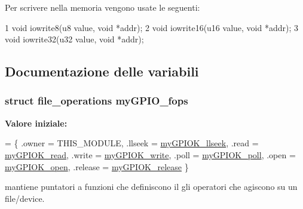 Per scrivere nella memoria vengono usate le seguenti\+:


\begin{DoxyCode}
1 void iowrite8(u8 value, void *addr);
2 void iowrite16(u16 value, void *addr);
3 void iowrite32(u32 value, void *addr);
\end{DoxyCode}


\subsection{Documentazione delle variabili}
\hypertarget{group___kernel-_module_ga9f31111fdb3b4a5944e18d45045e0f01}{
\subsubsection[{my\+G\+P\+I\+O\+\_\+fops}]{\setlength{\rightskip}{0pt plus 5cm}struct file\+\_\+operations my\+G\+P\+I\+O\+\_\+fops\hspace{0.3cm}{\ttfamily [static]}}}\label{group___kernel-_module_ga9f31111fdb3b4a5944e18d45045e0f01}
{\bfseries Valore iniziale\+:}
\begin{DoxyCode}
= \{
        .owner      = THIS\_MODULE,
        .llseek     = \hyperlink{group___kernel-_module_ga66e7f726b72320a272b633ecbaecefff}{myGPIOK\_llseek},
        .read       = \hyperlink{group___kernel-_module_ga90ac339df9c02ae5f11a2a7727adc923}{myGPIOK\_read},
        .write      = \hyperlink{group___kernel-_module_ga1eea0f6c86e8966ba9b701da57502aad}{myGPIOK\_write},
        .poll       = \hyperlink{group___kernel-_module_gaba935e8a8215c2ebce9a7147fd4f5147}{myGPIOK\_poll},
        .open       = \hyperlink{group___kernel-_module_gad013759c18fbf6ea96005b9b3bfa5b4e}{myGPIOK\_open},
        .release    = \hyperlink{group___kernel-_module_ga17ce7f574723246c790b70b06e3e7103}{myGPIOK\_release}
\}
\end{DoxyCode}


mantiene puntatori a funzioni che definiscono il gli operatori che agiscono su un file/device. 

